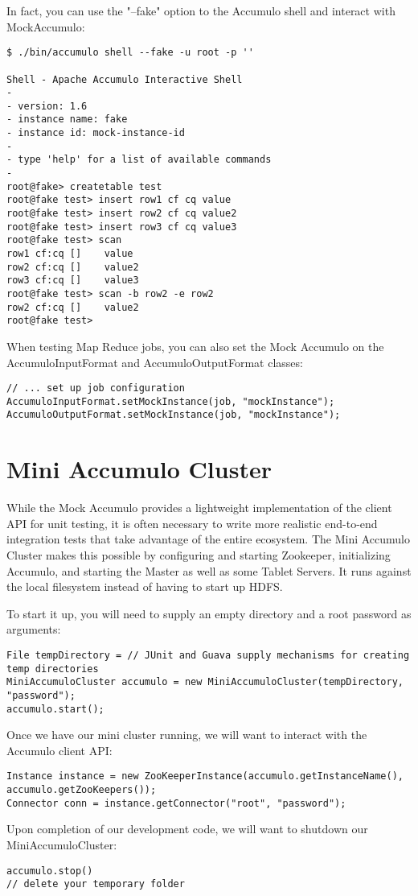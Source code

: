 In fact, you can use the "--fake" option to the Accumulo shell and interact with
MockAccumulo:

\small
\begin{verbatim}
$ ./bin/accumulo shell --fake -u root -p ''

Shell - Apache Accumulo Interactive Shell
-
- version: 1.6
- instance name: fake
- instance id: mock-instance-id
-
- type 'help' for a list of available commands
-
root@fake> createtable test
root@fake test> insert row1 cf cq value
root@fake test> insert row2 cf cq value2
root@fake test> insert row3 cf cq value3
root@fake test> scan
row1 cf:cq []    value
row2 cf:cq []    value2
row3 cf:cq []    value3
root@fake test> scan -b row2 -e row2
row2 cf:cq []    value2
root@fake test>
\end{verbatim}
\normalsize

When testing Map Reduce jobs, you can also set the Mock Accumulo on the AccumuloInputFormat
and AccumuloOutputFormat classes:

\small
\begin{verbatim}
// ... set up job configuration
AccumuloInputFormat.setMockInstance(job, "mockInstance");
AccumuloOutputFormat.setMockInstance(job, "mockInstance");
\end{verbatim}
\normalsize

\section{Mini Accumulo Cluster}

While the Mock Accumulo provides a lightweight implementation of the client API for unit
testing, it is often necessary to write more realistic end-to-end integration tests that
take advantage of the entire ecosystem. The Mini Accumulo Cluster makes this possible by
configuring and starting Zookeeper, initializing Accumulo, and starting the Master as well
as some Tablet Servers. It runs against the local filesystem instead of having to start
up HDFS.

To start it up, you will need to supply an empty directory and a root password as arguments:

\small
\begin{verbatim}
File tempDirectory = // JUnit and Guava supply mechanisms for creating temp directories
MiniAccumuloCluster accumulo = new MiniAccumuloCluster(tempDirectory, "password");
accumulo.start();
\end{verbatim}
\normalsize

Once we have our mini cluster running, we will want to interact with the Accumulo client API:

\small
\begin{verbatim}
Instance instance = new ZooKeeperInstance(accumulo.getInstanceName(), accumulo.getZooKeepers());
Connector conn = instance.getConnector("root", "password");
\end{verbatim}
\normalsize

Upon completion of our development code, we will want to shutdown our MiniAccumuloCluster:

\small
\begin{verbatim}
accumulo.stop()
// delete your temporary folder
\end{verbatim}
\normalsize
